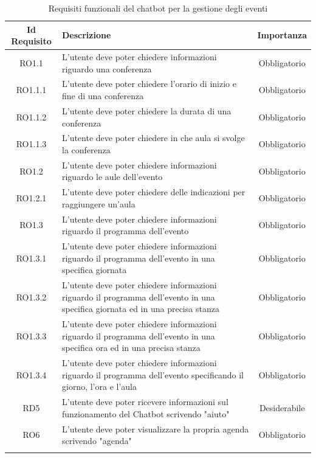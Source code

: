 \normalsize
\begin{longtable}{|c|>{\centering}m{7cm}|c|}
\hline
\textbf{Id Requisito} & \textbf{Descrizione} & \textbf{Importanza}\\
\hline
\endhead
RO1.1 & L'utente deve poter chiedere informazioni riguardo una conferenza & Obbligatorio\\ 
RO1.1.1 & L'utente deve poter chiedere l'orario di inizio e fine di una conferenza & Obbligatorio\\ 
RO1.1.2 & L'utente deve poter chiedere la durata di una conferenza & Obbligatorio\\
RO1.1.3 & L'utente deve poter chiedere in che aula si svolge la conferenza & Obbligatorio\\  
RO1.2 & L'utente deve poter chiedere informazioni riguardo le aule dell'evento & Obbligatorio\\ 
RO1.2.1 & L'utente deve poter chiedere delle indicazioni per raggiungere un'aula & Obbligatorio\\ 
RO1.3 & L'utente deve poter chiedere informazioni riguardo il programma dell'evento & Obbligatorio\\ 
RO1.3.1 & L'utente deve poter chiedere informazioni riguardo il programma dell'evento in una specifica giornata & Obbligatorio\\ 
RO1.3.2 & L'utente deve poter chiedere informazioni riguardo il programma dell'evento in una specifica giornata ed in una precisa stanza & Obbligatorio\\
RO1.3.3 & L'utente deve poter chiedere informazioni riguardo il programma dell'evento in una specifica ora ed in una precisa stanza & Obbligatorio\\
RO1.3.4 & L'utente deve poter chiedere informazioni riguardo il programma dell'evento specificando il giorno, l'ora e l'aula & Obbligatorio\\
RD5 & L'utente deve poter ricevere informazioni sul funzionamento del \gls{Chatbot} scrivendo "aiuto" & Desiderabile\\ 
RO6 & L'utente deve poter visualizzare la propria agenda scrivendo "agenda" & Obbligatorio\\ 
\hline
\caption{Requisiti funzionali del chatbot per la gestione degli eventi}
\end{longtable}

